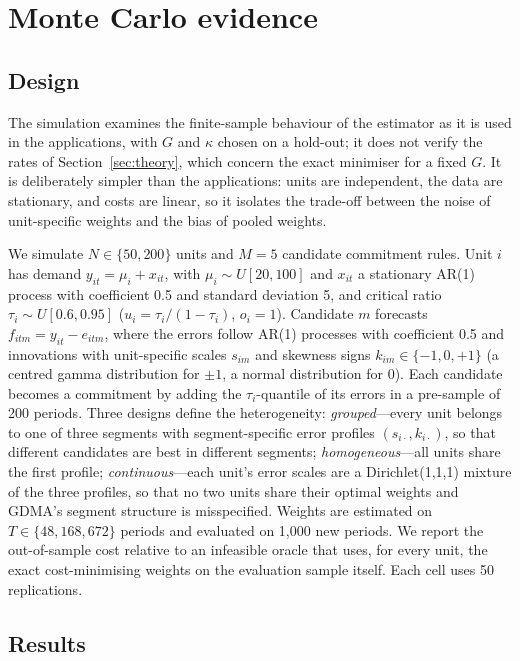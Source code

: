\section{Monte Carlo evidence}\label{sec:sim}

\subsection{Design}

The simulation examines the finite-sample behaviour of the estimator as it is used in the applications, with $G$ and $\kappa$ chosen on a hold-out; it does not verify the rates of Section~\ref{sec:theory}, which concern the exact minimiser for a fixed $G$.
It is deliberately simpler than the applications: units are independent, the data are stationary, and costs are linear, so it isolates the trade-off between the noise of unit-specific weights and the bias of pooled weights.

We simulate $N\in\{50,200\}$ units and $M=5$ candidate commitment rules.
Unit $i$ has demand $y_{it}=\mu_i+x_{it}$, with $\mu_i\sim U[20,100]$ and $x_{it}$ a stationary AR(1) process with coefficient 0.5 and standard deviation 5, and critical ratio $\tau_i\sim U[0.6,0.95]$ ($u_i=\tau_i/(1-\tau_i)$, $o_i=1$).
Candidate $m$ forecasts $f_{itm}=y_{it}-e_{itm}$, where the errors follow AR(1) processes with coefficient 0.5 and innovations with unit-specific scales $s_{im}$ and skewness signs $k_{im}\in\{-1,0,+1\}$ (a centred gamma distribution for $\pm1$, a normal distribution for 0).
Each candidate becomes a commitment by adding the $\tau_i$-quantile of its errors in a pre-sample of 200 periods.
Three designs define the heterogeneity:
\emph{grouped}---every unit belongs to one of three segments with segment-specific error profiles $(s_{i\cdot},k_{i\cdot})$, so that different candidates are best in different segments;
\emph{homogeneous}---all units share the first profile;
\emph{continuous}---each unit's error scales are a Dirichlet(1,1,1) mixture of the three profiles, so that no two units share their optimal weights and GDMA's segment structure is misspecified.
Weights are estimated on $T\in\{48,168,672\}$ periods and evaluated on 1,000 new periods.
We report the out-of-sample cost relative to an infeasible oracle that uses, for every unit, the exact cost-minimising weights on the evaluation sample itself.
Each cell uses 50 replications.

\subsection{Results}

